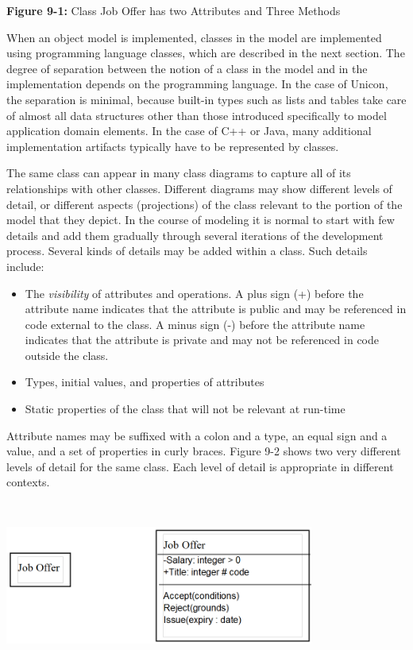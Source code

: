 {\sffamily\bfseries Figure 9-1:}
{\sffamily Class Job Offer has two Attributes and Three Methods}

\bigskip

When an object model is implemented, classes in the model are
implemented using programming language classes, which are described in
the next section. The degree of separation between the notion of a
class in the model and in the implementation depends on the programming
language. In the case of Unicon, the separation is minimal, because
built-in types such as lists and tables take care of almost all data
structures other than those introduced specifically to model
application domain elements. In the case of C++ or Java,
many additional implementation artifacts typically have to be
represented by classes.

The same class can appear in many class diagrams to capture all of its
relationships with other classes. Different diagrams may show different
levels of detail, or different aspects (projections) of the class
relevant to the portion of the model that they depict. In the course of
modeling it is normal to start with few details and add them gradually
through several iterations of the development process. Several kinds of
details may be added within a class. Such details include:

\begin{itemize}
\item The \textit{visibility} of
attributes and operations. A plus sign (+) before the attribute name
indicates that the attribute is public and may be
referenced in code external to the class. A minus sign
(-) before the attribute name indicates that the attribute is
private and may not be referenced in code outside the
class.
\item Types, initial values, and properties of attributes
\item Static properties of the class that will not be relevant at
run-time
\end{itemize}
Attribute names may be suffixed with a colon and a type, an equal sign
and a value, and a set of properties in curly braces. Figure 9-2 shows
two very different levels of detail for the same class. Each level of
detail is appropriate in different contexts.

\bigskip

\includegraphics[width=4in,height=2.2in]{ub-img/lodetail.png} 

